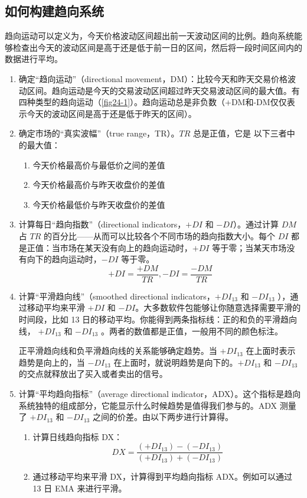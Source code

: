 \subsection*{如何构建趋向系统}
趋向运动可以定义为，今天价格波动区间超出前一天波动区间的比例。趋向系统能够检查出今天的波动区间是高于还是低于前一日的区间，然后将一段时间区间内的数据进行平均。
\begin{enumerate}
    \item 确定“趋向运动”（directional movement，DM）：比较今天和昨天交易价格波动区间。趋向运动是今天的交易波动区间超过昨天交易波动区间的最大值。有四种类型的趋向运动（\autoref{fig24-1}）。趋向运动总是非负数（+DM和-DM仅仅表示今天的波动区间是高于还是低于昨天的区间）。
    \item 确定市场的“真实波幅”（true range，TR）。$TR$ 总是正值，它是
          以下三者中的最大值：
          \begin{enumerate}
              \item 今天价格最高价与最低价之间的差值
              \item 今天价格最高价与昨天收盘价的差值
              \item 今天价格最低价与昨天收盘价的差值
          \end{enumerate}
    \item 计算每日“趋向指数”（directional indicators，$+DI$ 和 $-DI$）。通过计算 $DM$ 占 $TR$ 的百分比——从而可以比较各个不同市场的趋向指数大小。每个 $DI$ 都是正值：当市场在某天没有向上的趋向运动时，$+DI$ 等于零；当某天市场没有向下的趋向运动时，$-DI$ 等于零。
          $$+DI=\frac{+DM}{TR}, -DI=\frac{-DM}{TR}$$
    \item 计算“平滑趋向线”（smoothed directional indicators，$+DI_{13}$ 和 $-DI_{13}$ ），通过移动平均来平滑 $+DI$ 和 $-DI$。大多数软件包能够让你随意选择需要平滑的时间段，比如 13 日的移动平均。你能得到两条指标线：正的和负的平滑趋向线， $+DI_{13}$ 和 $-DI_{13}$ 。两者的数值都是正值，一般用不同的颜色标注。

          正平滑趋向线和负平滑趋向线的关系能够确定趋势。当 $+DI_{13}$ 在上面时表示趋势是向上的，当 $-DI_{13}$ 在上面时，就说明趋势是向下的。$+DI_{13}$ 和 $-DI_{13}$ 的交点就释放出了买入或者卖出的信号。
    \item 计算“平均趋向指标”（average directional indicator，ADX）。这个指标是趋向系统独特的组成部分，它能显示什么时候趋势是值得我们参与的。ADX 测量了 $+DI_{13}$ 和 $-DI_{13}$ 之间的价差。由以下两步进行计算得。
          \begin{enumerate}
              \item 计算日线趋向指标 DX：
                    $$DX=\frac{(+DI_{13})-(-DI_{13})}{(+DI_{13})+(-DI_{13})}$$
              \item 通过移动平均来平滑 DX，计算得到平均趋向指标 ADX。例如可以通过 13 日 EMA 来进行平滑。
          \end{enumerate}
\end{enumerate}
